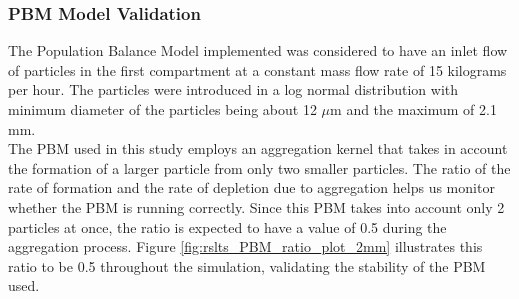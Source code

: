 \documentclass[preprint,11pt,authoryear]{elsarticle}
\begin{document}
\subsubsection{PBM Model Validation}
The Population Balance Model implemented was considered to have an inlet flow of particles in the 
first compartment at a constant mass flow rate of 15 kilograms per hour. The particles were introduced 
in a log normal distribution with minimum diameter of the particles being about 12 $\mu$m and the 
maximum of 2.1 mm. \\
The PBM used in this study employs an aggregation kernel that takes in account the formation of a 
larger particle from only two smaller particles. The ratio of the rate of formation and the rate of 
depletion due to aggregation helps us monitor whether the PBM is running correctly. Since this PBM 
takes into account only 2 particles at once, the ratio is expected to have a value of 0.5 during the 
aggregation process. Figure \ref{fig:rslts_PBM_ratio_plot_2mm} illustrates this ratio to be 0.5 
throughout the simulation, validating the stability of the PBM used.\\
\end{document}
